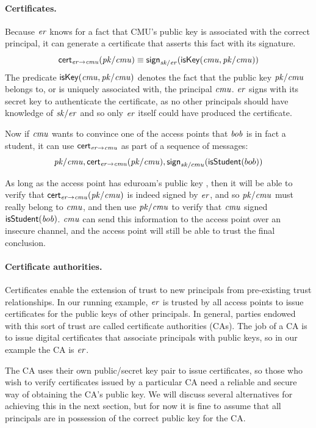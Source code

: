 \documentclass[11pt]{article}
\begin{document}
\paragraph{Certificates.}
Because $\mathit{er}$ knows for a fact that CMU's public key  is
associated with the correct principal, it can generate a
certificate that asserts this fact with its signature.
\[
  \mathsf{cert}_{{\mathit{er}} \mathbin{\rightarrow} {\mathit{cmu}}}(\mathit{pk/\mathit{cmu}}) \equiv \mathsf{sign}_{\mathit{sk/er}}(\mathsf{isKey}(\mathit{cmu}, \mathit{pk/\mathit{cmu}}))
\]
The predicate $\mathsf{isKey}(\mathit{cmu}, \mathit{pk/\mathit{\mathit{cmu}}})$ denotes the fact that the
public key $\mathit{pk/\mathit{\mathit{cmu}}}$ belongs to, or is uniquely associated with, the
principal $\mathit{cmu}$. $\mathit{er}$ signs with its secret key  to
authenticate the certificate, as no other principals should have knowledge of
$\mathit{sk/\mathit{er}}$ and so only $\mathit{er}$ itself could have produced the certificate.

Now if $\mathit{cmu}$ wants to convince one of the access points that $\mathit{bob}$
is in fact a student, it can use $\mathsf{cert}_{{\mathit{er}} \mathbin{\rightarrow} {\mathit{cmu}}}$ as part of a
sequence of messages:
\[
  \mathit{pk/cmu}, \mathsf{cert}_{{\mathit{er}} \mathbin{\rightarrow} {\mathit{cmu}}}(\mathit{pk/cmu}), \mathsf{sign}_{sk/cmu}(\mathsf{isStudent}(bob))
\]

As long as the access point has eduroam's public key , then it will
be able to verify that $\mathsf{cert}_{{\mathit{er}} \mathbin{\rightarrow} {\mathit{cmu}}}(\mathit{pk/\mathit{cmu}})$ is indeed
signed by $\mathit{er}$, and so $\mathit{pk/\mathit{cmu}}$ must really belong to $\mathit{cmu}$,
and then use $\mathit{pk/\mathit{cmu}}$ to verify that $\mathit{cmu}$ signed
$\mathsf{isStudent}(\mathit{bob})$.  $\mathit{cmu}$ can send this information to the
access point over an insecure channel, and the access point will still be able
to trust the final conclusion.

\paragraph{Certificate authorities.}
Certificates enable the extension of trust to new principals from
pre-existing trust relationships. In our running example, $\mathit{er}$ is
trusted by all access points to issue certificates for the public keys
of other principals. In general, parties endowed with this sort of
trust are called certificate authorities (CAs). The job of a CA
is to issue digital certificates that associate principals with public
keys, so in our example the CA is $\mathit{er}$.

The CA uses their own public/secret key pair to issue certificates, so
those who wish to verify certificates issued by a particular CA need a
reliable and secure way of obtaining the CA's public key. We will
discuss several alternatives for achieving this in the next section,
but for now it is fine to assume that all principals are in possession
of the correct public key for the CA.
\end{document}
